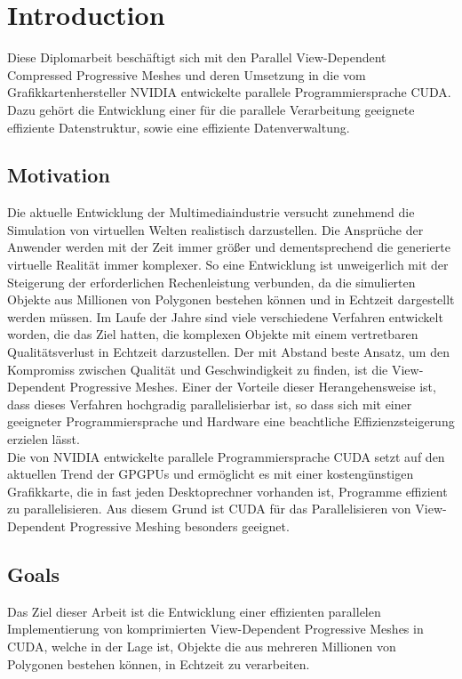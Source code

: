 \chapter{Introduction}
Diese Diplomarbeit beschäftigt sich mit den Parallel View-Dependent Compressed Progressive Meshes und deren Umsetzung in die vom Grafikkartenhersteller NVIDIA entwickelte parallele Programmiersprache CUDA. Dazu gehört die Entwicklung einer für die parallele Verarbeitung geeignete effiziente Datenstruktur, sowie eine effiziente Datenverwaltung.  

\section{Motivation}
Die aktuelle Entwicklung der Multimediaindustrie versucht zunehmend die Simulation von virtuellen Welten realistisch darzustellen. Die Ansprüche der Anwender werden mit der Zeit immer größer und dementsprechend die generierte virtuelle Realität immer komplexer. So eine Entwicklung ist unweigerlich mit der  Steigerung der erforderlichen Rechenleistung verbunden, da die simulierten Objekte aus  Millionen von Polygonen bestehen können und  in Echtzeit dargestellt werden müssen.
Im Laufe der Jahre sind viele verschiedene Verfahren entwickelt worden, die das Ziel hatten, die komplexen Objekte mit einem vertretbaren Qualitätsverlust in Echtzeit darzustellen. Der mit Abstand beste Ansatz, um den Kompromiss zwischen Qualität und Geschwindigkeit zu finden, ist die View-Dependent Progressive Meshes. Einer der Vorteile dieser Herangehensweise ist, dass dieses Verfahren hochgradig parallelisierbar ist, so dass sich mit einer geeigneter Programmiersprache und Hardware eine beachtliche Effizienzsteigerung erzielen lässt.\\
Die von NVIDIA entwickelte parallele Programmiersprache CUDA setzt auf den aktuellen Trend der GPGPUs und  ermöglicht es mit einer kostengünstigen Grafikkarte, die in fast jeden Desktoprechner vorhanden ist, Programme effizient zu parallelisieren. Aus diesem Grund ist CUDA für das Parallelisieren von View-Dependent Progressive Meshing besonders geeignet.

\section{Goals}\label{chp:Goals}   
Das Ziel dieser Arbeit ist die Entwicklung einer effizienten parallelen Implementierung  von komprimierten View-Dependent Progressive Meshes in CUDA, welche in der Lage ist, Objekte die aus mehreren Millionen von Polygonen bestehen können, in Echtzeit zu verarbeiten.

